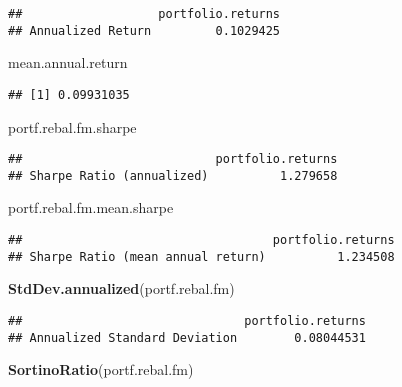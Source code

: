 \documentclass[
]{article}
\newenvironment{Shaded}{\begin{snugshade}}{\end{snugshade}}
\newcommand{\KeywordTok}[1]{\textcolor[rgb]{0.13,0.29,0.53}{\textbf{#1}}}
\newcommand{\NormalTok}[1]{#1}
\begin{document}
\begin{verbatim}
##                   portfolio.returns
## Annualized Return         0.1029425
\end{verbatim}

\begin{Shaded}
\begin{Highlighting}[]
\NormalTok{mean.annual.return}
\end{Highlighting}
\end{Shaded}

\begin{verbatim}
## [1] 0.09931035
\end{verbatim}

\begin{Shaded}
\begin{Highlighting}[]
\NormalTok{portf.rebal.fm.sharpe}
\end{Highlighting}
\end{Shaded}

\begin{verbatim}
##                           portfolio.returns
## Sharpe Ratio (annualized)          1.279658
\end{verbatim}

\begin{Shaded}
\begin{Highlighting}[]
\NormalTok{portf.rebal.fm.mean.sharpe}
\end{Highlighting}
\end{Shaded}

\begin{verbatim}
##                                   portfolio.returns
## Sharpe Ratio (mean annual return)          1.234508
\end{verbatim}

\begin{Shaded}
\begin{Highlighting}[]
\KeywordTok{StdDev.annualized}\NormalTok{(portf.rebal.fm)}
\end{Highlighting}
\end{Shaded}

\begin{verbatim}
##                               portfolio.returns
## Annualized Standard Deviation        0.08044531
\end{verbatim}

\begin{Shaded}
\begin{Highlighting}[]
\KeywordTok{SortinoRatio}\NormalTok{(portf.rebal.fm)}
\end{Highlighting}
\end{Shaded}
\end{document}
